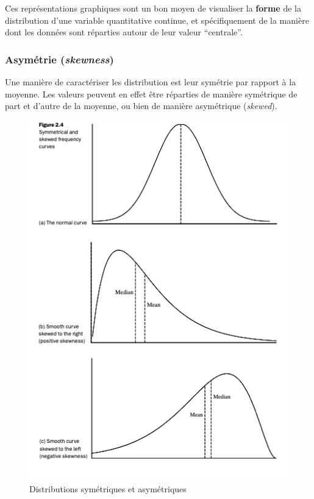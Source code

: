 \documentclass[
]{book}
\begin{document}
Ces représentations graphiques sont un bon moyen de visualiser la \textbf{forme} de la distribution d'une variable quantitative continue, et spécifiquement de la manière dont les données sont réparties autour de leur valeur ``centrale''.

\hypertarget{asymuxe9trie-skewness}{%
\subsubsection{\texorpdfstring{Asymétrie (\emph{skewness})}{Asymétrie (skewness)}}\label{asymuxe9trie-skewness}}

Une manière de caractériser les distribution est leur symétrie par rapport à la moyenne. Les valeurs peuvent en effet être réparties de manière symétrique de part et d'autre de la moyenne, ou bien de manière asymétrique (\emph{skewed}).

\begin{figure}
\centering
\includegraphics{images/skewed.png}
\caption{Distributions symétriques et asymétriques \citep[p.54]{feinstein2002}}
\end{figure}
\end{document}
